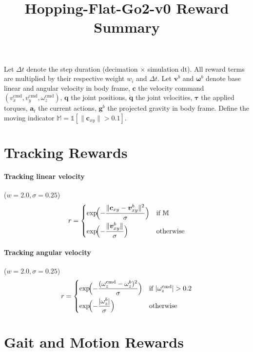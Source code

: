 \documentclass[11pt, a4paper]{article}
\title{Hopping-Flat-Go2-v0 Reward Summary}
\date{}
\begin{document}
\maketitle

Let $\Delta t$ denote the step duration (decimation $\times$ simulation dt).
All reward terms are multiplied by their respective weight $w_i$ and $\Delta t$.
Let $\bm{v}^b$ and $\bm{\omega}^b$ denote base linear and angular velocity in body frame,
$\bm{c}$ the velocity command $(v_x^{\text{cmd}}, v_y^{\text{cmd}}, \omega_z^{\text{cmd}})$,
$\bm{q}$ the joint positions, $\dot{\bm{q}}$ the joint velocities,
$\bm{\tau}$ the applied torques, $\bm{a}_t$ the current actions,
$\bm{g}^b$ the projected gravity in body frame.
Define the moving indicator $\mathbb{M} = \mathbb{1}[\|\bm{c}_{xy}\| > 0.1]$.

\section{Tracking Rewards}

\paragraph{Tracking linear velocity} ($w = 2.0, \sigma = 0.25$)
\[
  r = \begin{cases}
    \exp\!\Bigl(-\dfrac{\|{\bm{c}_{xy} - \bm{v}^b_{xy}}\|^2}{\sigma}\Bigr) & \text{if } \mathbb{M} \\[6pt]
    \exp\!\Bigl(-\dfrac{\|\bm{v}^b_{xy}\|}{\sigma}\Bigr) & \text{otherwise}
  \end{cases}
\]

\paragraph{Tracking angular velocity} ($w = 2.0, \sigma = 0.25$)
\[
  r = \begin{cases}
    \exp\!\Bigl(-\dfrac{(\omega_z^{\text{cmd}} - \omega^b_z)^2}{\sigma}\Bigr) & \text{if } |\omega_z^{\text{cmd}}| > 0.2 \\[6pt]
    \exp\!\Bigl(-\dfrac{|\omega^b_z|}{\sigma}\Bigr) & \text{otherwise}
  \end{cases}
\]

\section{Gait and Motion Rewards}
\end{document}
